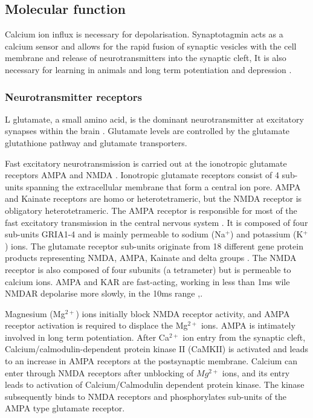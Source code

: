 \subsection{Molecular function}
Calcium ion influx is necessary for depolarisation. Synaptotagmin acts as a calcium sensor and allows for the rapid fusion of synaptic vesicles with the cell membrane and release of neurotransmitters into the synaptic cleft\cite{martens2007synaptotagmin},  It is also necessary for learning in animals and long term potentiation and depression \cite{lisman2012mechanisms}.
\subsubsection{Neurotransmitter receptors}
\label{sec:Neurotransmitter receptors}
L glutamate, a small amino acid, is the dominant neurotransmitter at excitatory synapses within the brain \cite{niswender2010metabotropic}. Glutamate levels are controlled by the glutamate glutathione pathway and glutamate transporters\cite{sedlak2019glutathione}.

Fast excitatory neurotransmission is carried out at the ionotropic glutamate receptors AMPA and NMDA \cite{traynelis2010glutamate}. Ionotropic glutamate receptors consist of 4 sub-units spanning the extracellular membrane that form a central ion pore. AMPA and Kainate receptors are homo or heterotetrameric, but the NMDA receptor is obligatory heterotetrameric. The AMPA receptor is responsible for most of the fast excitatory transmission in the central nervous system \cite{henley2013ampa}. It is composed of four sub-units GRIA1-4 and is mainly permeable to sodium (Na$^+$) and potassium (K$^+$) ions. The glutamate receptor sub-units originate from 18 different gene protein products representing NMDA, AMPA, Kainate and delta groups \cite{traynelis2010glutamate}. The NMDA receptor is also composed of four subunits (a tetrameter)  but is permeable to calcium ions. AMPA and KAR are fast-acting, working in less than 1ms\cite{traynelis2010glutamate} wile NMDAR depolarise more slowly, in the 10ms range \cite{traynelis2010glutamate},\cite{nicoll2017brief}. 

Magnesium (Mg$^{2+}$) ions initially block NMDA receptor activity, and  AMPA receptor activation is required to displace the Mg$^{2+}$ ions. AMPA is intimately involved in long term potentiation. After Ca$^{2+}$ ion entry from the synaptic cleft, Calcium/calmodulin-dependent protein kinase II (CaMKII) is activated and leads to an increase in AMPA receptors at the postsynaptic membrane. Calcium can enter through NMDA receptors after unblocking of $Mg^{2+}$ ions, and its entry leads to activation of Calcium/Calmodulin dependent protein kinase. The kinase subsequently binds to NMDA receptors and phosphorylates sub-units of the AMPA type glutamate receptor.

